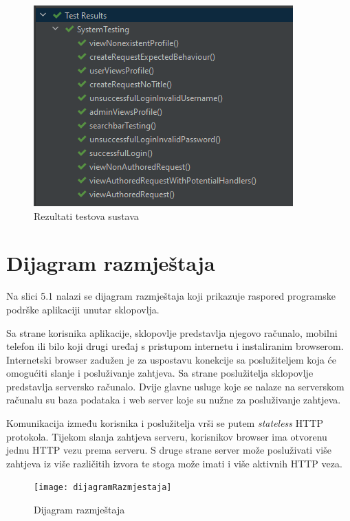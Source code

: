 			
			
			
			\begin{figure}[H]
				\includegraphics[scale=1.2]{slike/selenium-testing.png}
				\centering
				\caption{Rezultati testova sustava}
				
			\end{figure}
			
			 
			
			\eject 
		
		
		\section{Dijagram razmještaja}
			
			Na slici 5.1 nalazi se dijagram razmještaja koji prikazuje raspored programske podrške aplikaciji unutar sklopovlja.
			
			Sa strane korisnika aplikacije, sklopovlje predstavlja njegovo računalo, mobilni telefon ili bilo koji drugi uređaj s pristupom internetu i instaliranim browserom.
			Internetski browser zadužen je za uspostavu konekcije sa poslužiteljem koja će omogućiti slanje i posluživanje zahtjeva.
			Sa strane poslužitelja sklopovlje predstavlja serversko računalo.
			Dvije glavne usluge koje se nalaze na serverskom računalu su baza podataka i web server koje su nužne za posluživanje zahtjeva.
			
			Komunikacija između korisnika i poslužitelja vrši se putem \textit{stateless} HTTP protokola. 
			Tijekom slanja zahtjeva serveru, korisnikov browser ima otvorenu jednu HTTP vezu prema serveru.
			S druge strane server može posluživati više zahtjeva iz više različitih izvora te stoga može imati i više aktivnih HTTP veza.
			
			\begin{figure}[h]
				\texttt{[image: dijagramRazmjestaja]}
				\caption{Dijagram razmještaja}
			\end{figure} 
			
